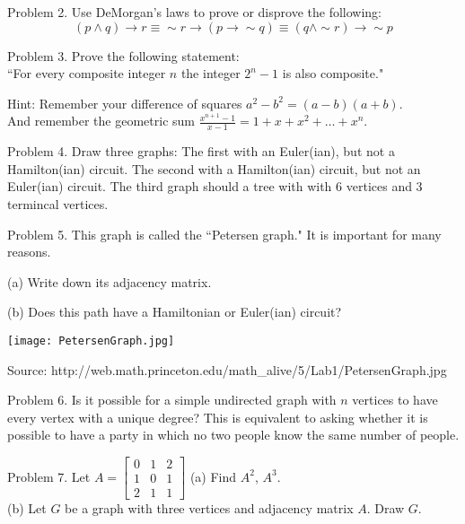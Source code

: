\documentclass[16 pt]{amsart}
\theoremstyle{definition}
\theoremstyle{remark}
\numberwithin{equation}{subsection}
\begin{document}
\vspace{2.5in}

Problem 2. Use DeMorgan's laws to prove or disprove the following:
\[
(p\wedge q)\rightarrow r \equiv \sim r \rightarrow (p\rightarrow \sim q) \equiv (q\wedge \sim r) \rightarrow \sim p
\]


\newpage

Problem 3. Prove the following statement:\\
``For every composite integer $n$ the integer $2^n -1 $ is also composite."

\vspace{.5in}
Hint: Remember your difference of squares $a^2-b^2 = (a-b)(a+b)$.\\
And remember the geometric sum $\frac{x^{n+1}-1}{x-1} = 1 + x + x^2 + \dots + x^n$.

\newpage

Problem 4. Draw three graphs: The first with an Euler(ian), but not a Hamilton(ian) circuit.  The second with a Hamilton(ian) circuit, but not an Euler(ian) circuit. The third graph should a tree with with 6 vertices and 3 termincal vertices.

\newpage

Problem 5. This graph is called the ``Petersen graph." It is important for many reasons.

(a) Write down its adjacency matrix.

(b) Does this path have a Hamiltonian or Euler(ian) circuit?


\texttt{[image: PetersenGraph.jpg]}





Source: http://web.math.princeton.edu/math\_alive/5/Lab1/PetersenGraph.jpg
\newpage

Problem 6.  Is it possible for a simple undirected graph with $n$ vertices to have every vertex with a unique degree? This is equivalent to asking whether it is possible to have a party in which no two people know the same number of people.

\newpage 

Problem 7.  Let $ A= \begin{bmatrix}
0 & 1 & 2 \\ 1 & 0 & 1 \\ 2 & 1 & 1
\end{bmatrix}$ 
(a) Find $A^2$, $A^3$.\\

(b) Let $G$ be a graph with three vertices and adjacency matrix $A$.  Draw $G$.\\
\end{document}

